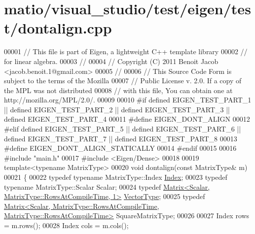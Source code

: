 \hypertarget{matio_2visual__studio_2test_2eigen_2test_2dontalign_8cpp_source}{}\section{matio/visual\+\_\+studio/test/eigen/test/dontalign.cpp}
\label{matio_2visual__studio_2test_2eigen_2test_2dontalign_8cpp_source}

\begin{DoxyCode}
00001 \textcolor{comment}{// This file is part of Eigen, a lightweight C++ template library}
00002 \textcolor{comment}{// for linear algebra.}
00003 \textcolor{comment}{//}
00004 \textcolor{comment}{// Copyright (C) 2011 Benoit Jacob <jacob.benoit.1@gmail.com>}
00005 \textcolor{comment}{//}
00006 \textcolor{comment}{// This Source Code Form is subject to the terms of the Mozilla}
00007 \textcolor{comment}{// Public License v. 2.0. If a copy of the MPL was not distributed}
00008 \textcolor{comment}{// with this file, You can obtain one at http://mozilla.org/MPL/2.0/.}
00009 
00010 \textcolor{preprocessor}{#if defined EIGEN\_TEST\_PART\_1 || defined EIGEN\_TEST\_PART\_2 || defined EIGEN\_TEST\_PART\_3 || defined
       EIGEN\_TEST\_PART\_4}
00011 \textcolor{preprocessor}{#define EIGEN\_DONT\_ALIGN}
00012 \textcolor{preprocessor}{#elif defined EIGEN\_TEST\_PART\_5 || defined EIGEN\_TEST\_PART\_6 || defined EIGEN\_TEST\_PART\_7 || defined
       EIGEN\_TEST\_PART\_8}
00013 \textcolor{preprocessor}{#define EIGEN\_DONT\_ALIGN\_STATICALLY}
00014 \textcolor{preprocessor}{#endif}
00015 
00016 \textcolor{preprocessor}{#include "main.h"}
00017 \textcolor{preprocessor}{#include <Eigen/Dense>}
00018 
00019 \textcolor{keyword}{template}<\textcolor{keyword}{typename} MatrixType>
00020 \textcolor{keywordtype}{void} dontalign(\textcolor{keyword}{const} MatrixType& m)
00021 \{
00022   \textcolor{keyword}{typedef} \textcolor{keyword}{typename} MatrixType::Index \hyperlink{namespace_eigen_a62e77e0933482dafde8fe197d9a2cfde}{Index};
00023   \textcolor{keyword}{typedef} \textcolor{keyword}{typename} MatrixType::Scalar Scalar;
00024   \textcolor{keyword}{typedef} \hyperlink{group___core___module_class_eigen_1_1_matrix}{Matrix<Scalar, MatrixType::RowsAtCompileTime, 1>} 
      \hyperlink{struct_vector_type}{VectorType};
00025   \textcolor{keyword}{typedef} 
      \hyperlink{group___core___module_class_eigen_1_1_matrix}{Matrix<Scalar, MatrixType::RowsAtCompileTime, MatrixType::RowsAtCompileTime>}
       SquareMatrixType;
00026 
00027   Index rows = m.rows();
00028   Index cols = m.cols();

\end{DoxyCode}
